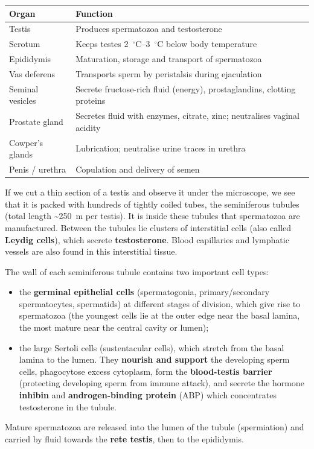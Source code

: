 \documentclass[11pt]{article}
\newcommand{\cle}[1]{{\popxbold\color{popdark}#1}}
\newcounter{popsec}
\newcounter{popsub}
\newcommand{\courssub}[1]{%
  \stepcounter{popsub}%
  \par\vspace{9pt}\noindent{\popxbold\fontsize{11.5}{13}\selectfont\color{popink}{\color{poporange}\thepopsec.\thepopsub}\hspace{6pt}#1}\par\nopagebreak\vspace{4pt}
}
\begin{document}
\begin{aretenir}
\begin{center}
\begin{tabularx}{\linewidth}{|l|X|}\hline
\rowcolor{popblueL} \textbf{Organ} & \textbf{Function} \\ \hline
Testis & Produces spermatozoa and testosterone \\ \hline
Scrotum & Keeps testes \SI{2}{\ensuremath{{}^{\circ}\mathrm{C}}}--\SI{3}{\ensuremath{{}^{\circ}\mathrm{C}}} below body temperature \\ \hline
Epididymis & Maturation, storage and transport of spermatozoa \\ \hline
Vas deferens & Transports sperm by peristalsis during ejaculation \\ \hline
Seminal vesicles & Secrete fructose-rich fluid (energy), prostaglandins, clotting proteins \\ \hline
Prostate gland & Secretes fluid with enzymes, citrate, zinc; neutralises vaginal acidity \\ \hline
Cowper's glands & Lubrication; neutralise urine traces in urethra \\ \hline
Penis / urethra & Copulation and delivery of semen \\ \hline
\end{tabularx}
\end{center}
\end{aretenir}

\courssub{Microscopic Structure of the Testis}

If we cut a thin section of a testis and observe it under the microscope, we see that it is packed with hundreds of tightly coiled tubes, the \cle{seminiferous tubules} (total length \textasciitilde\SI{250}{m} per testis). It is inside these tubules that spermatozoa are manufactured. Between the tubules lie clusters of \cle{interstitial cells} (also called \textbf{Leydig cells}), which secrete \textbf{testosterone}. Blood capillaries and lymphatic vessels are also found in this interstitial tissue.

The wall of each seminiferous tubule contains two important cell types:
\begin{itemize}
\item the \textbf{germinal epithelial cells} (spermatogonia, primary/secondary spermatocytes, spermatids) at different stages of division, which give rise to spermatozoa (the youngest cells lie at the outer edge near the basal lamina, the most mature near the central cavity or lumen);
\item the large \cle{Sertoli cells} (sustentacular cells), which stretch from the basal lamina to the lumen. They \textbf{nourish and support} the developing sperm cells, phagocytose excess cytoplasm, form the \textbf{blood-testis barrier} (protecting developing sperm from immune attack), and secrete the hormone \textbf{inhibin} and \textbf{androgen-binding protein} (ABP) which concentrates testosterone in the tubule.
\end{itemize}
Mature spermatozoa are released into the lumen of the tubule (spermiation) and carried by fluid towards the \textbf{rete testis}, then to the epididymis.
\end{document}
